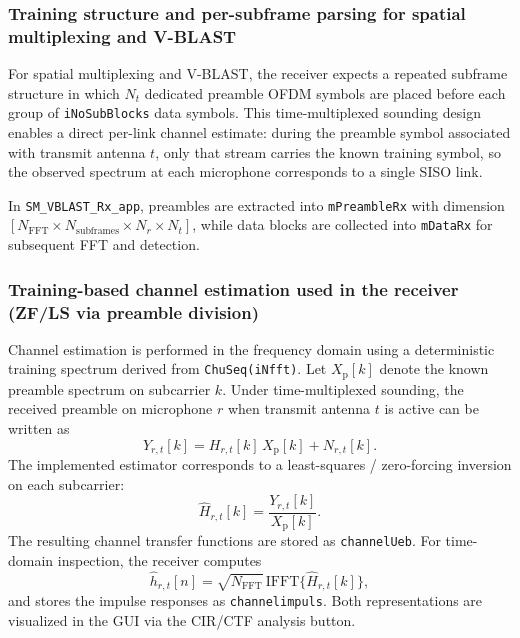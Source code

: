 \subsubsection{Training structure and per-subframe parsing for spatial multiplexing and V-BLAST}
\label{sec:framing_parsing_clean}

For spatial multiplexing and V-BLAST, the receiver expects a repeated subframe structure in which $N_t$ dedicated preamble OFDM symbols are placed before each group of \texttt{iNoSubBlocks} data symbols. This time-multiplexed sounding design enables a direct per-link channel estimate: during the preamble symbol associated with transmit antenna $t$, only that stream carries the known training symbol, so the observed spectrum at each microphone corresponds to a single SISO link.

In \texttt{SM\_VBLAST\_Rx\_app}, preambles are extracted into \texttt{mPreambleRx} with dimension $[N_{\mathrm{FFT}} \times N_{\mathrm{subframes}} \times N_r \times N_t]$, while data blocks are collected into \texttt{mDataRx} for subsequent FFT and detection.

\subsubsection{Training-based channel estimation used in the receiver (ZF/LS via preamble division)}
\label{sec:chest_zf_clean}

Channel estimation is performed in the frequency domain using a deterministic training spectrum derived from \texttt{ChuSeq(iNfft)}. Let $X_{\mathrm{p}}[k]$ denote the known preamble spectrum on subcarrier $k$. Under time-multiplexed sounding, the received preamble on microphone $r$ when transmit antenna $t$ is active can be written as
\begin{equation}
Y_{r,t}[k] = H_{r,t}[k]\,X_{\mathrm{p}}[k] + N_{r,t}[k].
\end{equation}
The implemented estimator corresponds to a least-squares / zero-forcing inversion on each subcarrier:
\begin{equation}
\hat{H}_{r,t}[k] = \frac{Y_{r,t}[k]}{X_{\mathrm{p}}[k]}.
\label{eq:zf_ls_clean}
\end{equation}
The resulting channel transfer functions are stored as \texttt{channelUeb}. For time-domain inspection, the receiver computes
\begin{equation}
\hat{h}_{r,t}[n] = \sqrt{N_{\mathrm{FFT}}}\,\mathrm{IFFT}\{\hat{H}_{r,t}[k]\},
\end{equation}
and stores the impulse responses as \texttt{channelimpuls}. Both representations are visualized in the GUI via the CIR/CTF analysis button.

